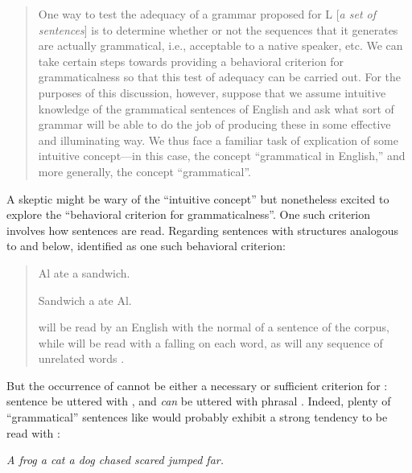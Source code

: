 \begin{quote}
One way to test the adequacy of a grammar proposed for L [\textit{a set of sentences}] is to determine whether or not the sequences that it generates are actually grammatical, i.e., acceptable to a native speaker, etc. We can take certain steps towards providing a behavioral criterion for grammaticalness so that this test of adequacy can be carried out. For the purposes of this discussion, however, suppose that we assume intuitive knowledge of the grammatical sentences of English and ask what sort of grammar will be able to do the job of producing these in some effective and illuminating way. We thus face a familiar task of explication of some intuitive concept—in this case, the concept “grammatical in English,” and more generally, the concept “grammatical”. \citep[13]{Chomsky1957}
\end{quote}

  A skeptic might be wary of the “intuitive concept” but nonetheless excited to explore the “behavioral criterion for grammaticalness”. One such criterion involves how sentences are read. Regarding sentences with structures analogous to  and  below, \citet{Chomsky1956} identified  as one such behavioral criterion:

\begin{quote} 
  
\ea\label{ex:6:1}
Al ate a sandwich.
\z


\ea\label{ex:6:2}
Sandwich a ate Al.%
\z

 will be read by an English  with the normal  of a sentence of the corpus, while  will be read with a falling  on each word, as will any sequence of unrelated words \citep[114]{Chomsky1956}.

\end{quote}


  But the occurrence of  cannot be either a necessary or sufficient criterion for : sentence   be uttered with , and  \textit{can} be uttered with phrasal . Indeed, plenty of “grammatical” sentences like  would probably exhibit a strong tendency to be read with : 

\ea\label{ex:6:3}
\textit{A frog a cat a dog chased scared jumped far.}
\z

